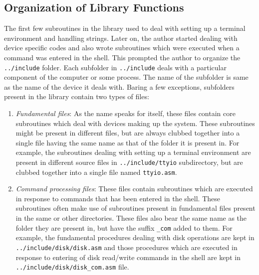 \subsection{Organization of Library Functions}
The first few subroutines in the library used to deal with setting up a terminal environment and handling strings. Later on, the author started dealing with device specific codes and also wrote subroutines which were executed when a command was entered in the shell. This prompted the author to organize the \texttt{../include} folder. Each subfolder in  \texttt{../include} deals with a particular component of the computer or some process. The name of the subfolder is same as the name of the device it deals with. Baring a few exceptions, subfolders present in the library contain two types of files:
\begin{enumerate}
  \item \textit{Fundamental files}: As the name speaks for itself, these files contain core subroutines which deal with devices making up the system. These subroutines might be present in different files, but are always clubbed together into a single file having the same name as that of the folder it is present in. For example, the subroutines dealing with setting up a terminal environment are present in different source files in \texttt{../include/ttyio} subdirectory, but are clubbed together into a single file named \texttt{ttyio.asm}.
  \item \textit{Command processing files}: These files contain subroutines which are executed in response to commands that has been entered in the shell. These subroutines often make use of subroutines present in fundamental files present in the same or other directories. These files also bear the same name as the folder they are present in, but have the suffix \texttt{\_com} added to them. For example, the fundamental procedures dealing with disk operations are kept in \texttt{../include/disk/disk.asm} and those procedures which are executed in response to entering of disk read/write commands in the shell are kept in \texttt{../include/disk/disk\_com.asm} file.
\end{enumerate}

